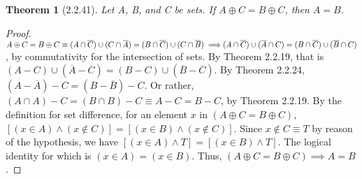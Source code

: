 \documentclass[a4paper, 12pt]{article}
\theoremstyle{plain}
\newtheorem*{theorem*}{Theorem}
\begin{document}
	
	\begin{theorem*}[2.2.41]
		Let A, B, and C be sets. If $A \oplus C = B \oplus C$, then $A = B$.
	\end{theorem*}
	
	\begin{proof}
		$A \oplus C = B \oplus C \equiv (A \cap \overline{C}) \cup (C \cap \overline{A}) = (B \cap \overline{C}) \cup (C \cap \overline{B}) \implies \newline (A \cap \overline{C}) \cup (\overline{A} \cap C) = (B \cap \overline{C}) \cup (\overline{B} \cap C)$, by commutativity for the intersection of sets. By Theorem 2.2.19, that is $(A-C) \cup (\overline{A} - \overline{C}) = (B - C) \cup (\overline{B} - \overline{C})$. By Theorem 2.2.24, $(A - \overline{A}) - C = (B - \overline{B}) - C$. Or rather, \newline $(A \cap A) - C = (B \cap B) - C \equiv A - C = B - C$, by Theorem 2.2.19. By the definition for set difference, for an element $x$ in $(A \oplus C = B \oplus C)$, $[(x \in A) \land (x \notin C)] = [(x \in B) \land (x \notin C)]$. Since $x \notin C \equiv T$ by reason of the hypothesis, we have $[(x \in A) \land T] = [(x \in B) \land T]$. The logical identity for which is $(x \in A) = (x \in B)$. Thus, $(A \oplus C = B \oplus C) \implies A = B$.
	\end{proof}
\end{document}
